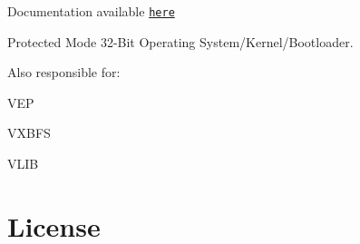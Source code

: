 \href{https://app.fossa.com/projects/git%2Bgithub.com%2Fryelow90210%2FVitalityX?ref=badge_shield}{\tt }  

Documentation available \href{https://psychosisinteractive.github.io/vitalityx/html}{\tt here}

Protected Mode 32-\/\+Bit Operating System/\+Kernel/\+Bootloader.

Also responsible for\+:
\begin{DoxyEnumerate}
\item V\+EP
\item V\+X\+B\+FS
\item V\+L\+IB
\end{DoxyEnumerate}\hypertarget{a00354_autotoc_md15}{}\section{License}\label{a00354_autotoc_md15}
\href{https://app.fossa.com/projects/git%2Bgithub.com%2Fryelow90210%2FVitalityX?ref=badge_large}{\tt }

